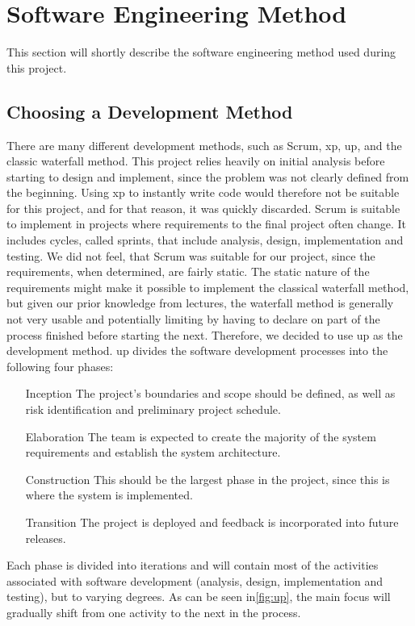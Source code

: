 \section{Software Engineering Method}
\label{sec:software_engineering_method}
This section will shortly describe the software engineering method used during this project.

\subsection{Choosing a Development Method}
There are many different development methods, such as Scrum, \ac{xp}, \ac{up}, and the classic waterfall method.
This project relies heavily on initial analysis before starting to design and implement, since the problem was not clearly defined from the beginning.
Using \ac{xp} to instantly write code would therefore not be suitable for this project, and for that reason, it was quickly discarded.
Scrum is suitable to implement in projects where requirements to the final project often change.
It includes cycles, called sprints, that include analysis, design, implementation and testing.
We did not feel, that Scrum was suitable for our project, since the requirements, when determined, are fairly static.
The static nature of the requirements might make it possible to implement the classical waterfall method, but given our prior knowledge from lectures, the waterfall method is generally not very usable and potentially limiting by having to declare on part of the process finished before starting the next.
Therefore, we decided to use \ac{up} as the development method.
\ac{up} divides the software development processes into the following four phases: 

\begin{itemize}
\item[Inception] The project's boundaries and scope should be defined, as well as risk identification and preliminary project schedule.
\item[Elaboration] The team is expected to create the majority of the system requirements and establish the system architecture.
\item[Construction] This should be the largest phase in the project, since this is where the system is implemented.
\item[Transition] The project is deployed and feedback is incorporated into future releases.
\end{itemize}

Each phase is divided into iterations and will contain most of the activities associated with software development (analysis, design, implementation and testing), but to varying degrees. As can be seen in\autoref{fig:up}, the main focus will gradually shift from one activity to the next in the process.

